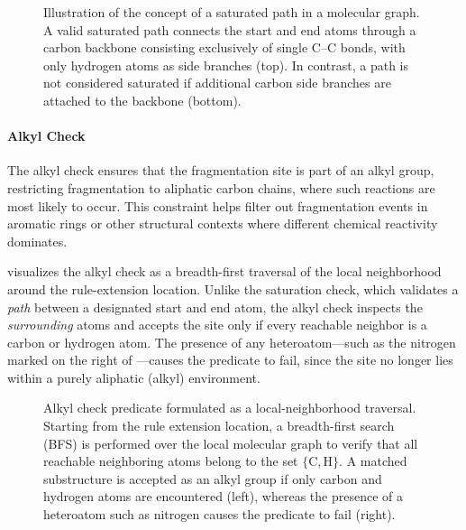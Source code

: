 \begin{figure}[H]
    \centering
    
    \caption[Saturation check predicate as constrained path traversal]{
        Illustration of the concept of a saturated path in a molecular graph. 
        A valid saturated path connects the start and end atoms through a carbon backbone consisting exclusively of single C--C bonds, with only hydrogen atoms as side branches (top). 
        In contrast, a path is not considered saturated if additional carbon side branches are attached to the backbone (bottom).
    }
    \label{fig:saturation-check}
\end{figure}

\paragraph{Alkyl Check}
The alkyl check ensures that the fragmentation site is part of an alkyl group, restricting fragmentation to aliphatic carbon chains, where such reactions are most likely to occur. 
This constraint helps filter out fragmentation events in aromatic rings or other structural contexts where different chemical reactivity dominates. 

 visualizes the alkyl check as a breadth-first traversal of the local neighborhood around the rule-extension location.
Unlike the saturation check, which validates a \emph{path} between a designated start and end atom, the alkyl check inspects the \emph{surrounding} atoms and accepts the site only if every reachable neighbor is a carbon or hydrogen atom.
The presence of any heteroatom---such as the nitrogen marked on the right of ---causes the predicate to fail, since the site no longer lies within a purely aliphatic (alkyl) environment.

\begin{figure}[H]
    \centering
    
    \caption[Alkyl check predicate]{
        Alkyl check predicate formulated as a local-neighborhood traversal.
        Starting from the rule extension location, a breadth-first search (BFS) is performed over the local molecular graph to verify that all reachable neighboring atoms belong to the set \(\{ \mathrm{C}, \mathrm{H} \}\).
        A matched substructure is accepted as an alkyl group if only carbon and hydrogen atoms are encountered (left),   whereas the presence of a heteroatom such as nitrogen causes the predicate to fail (right).
    }
    \label{fig:alkyl-check}
\end{figure}

